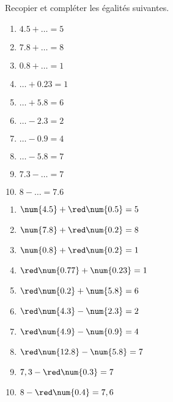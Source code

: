 \begin{exercice}
    Recopier et compléter les égalités suivantes.
    \begin{multicols}{2}
        \begin{spacing}{1.5}
            \begin{enumerate}
                \item $\num{4.5}+\dots =5$
                \item $\num{7.8}+\dots=8$
                \item $\num{0.8}+\dots=1$
                \item $\dots+\num{0.23}=1$
                \item $\dots+\num{5.8}=6$
                \item $\dots-\num{2.3} =2$
                \item $\dots-\num{0.9} =4$
                \item $\dots-\num{5.8} =7$
                \item $\num{7.3}-\dots =7$
                \item $8-\dots =\num{7.6}$
            \end{enumerate}
        \end{spacing}
    \end{multicols}
 \end{exercice}
 \begin{corrige}
    \begin{enumerate}
        \item $\num{4.5}+{\red \num{0.5}} =5$
        \item $\num{7.8}+{\red \num{0.2}}=8$
        \item $\num{0.8}+{\red \num{0.2}}=1$
        \item ${\red\num{0.77}}+\num{0.23}=1$
        \item ${\red\num{0.2}}+\num{5.8}=6$
        \item ${\red\num{4.3}}-\num{2.3} =2$
        \item ${\red\num{4.9}}-\num{0.9} =4$
        \item ${\red\num{12.8}}-\num{5.8} =7$
        \item $7,3-{\red\num{0.3}} =7$
        \item $8-  {\red\num{0.4}} =7,6$
    \end{enumerate}
 \end{corrige}